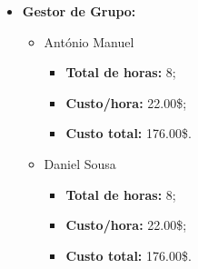 \begin{itemize}
	\item \textbf{Gestor de Grupo:}
		\begin{itemize}
			\item António Manuel
				\begin{itemize}
					\item \textbf{Total de horas:} 8;
					\item \textbf{Custo/hora:} 22.00\$;
					\item \textbf{Custo total:} 176.00\$.
				\end{itemize}
			\item Daniel Sousa
				\begin{itemize}
					\item \textbf{Total de horas:} 8;
					\item \textbf{Custo/hora:} 22.00\$;
					\item \textbf{Custo total:} 176.00\$.
				\end{itemize}
		\end{itemize}
\end{itemize}

